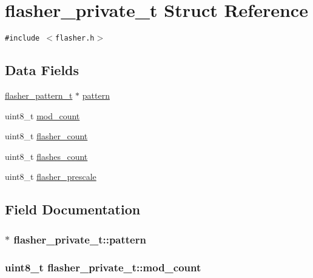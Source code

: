 \hypertarget{structflasher__private__t}{
\section{flasher\_\-private\_\-t Struct Reference}
\label{structflasher__private__t}
}
{\tt \#include $<$flasher.h$>$}

\subsection*{Data Fields}
\begin{CompactItemize}
\item 
\hyperlink{structflasher__pattern__t}{flasher\_\-pattern\_\-t} $\ast$ \hyperlink{structflasher__private__t_ba1d1e2c388c469ffaf6811226e911ab}{pattern}
\item 
uint8\_\-t \hyperlink{structflasher__private__t_6ca9584807ab04f330c5fe49f47a923f}{mod\_\-count}
\item 
uint8\_\-t \hyperlink{structflasher__private__t_d64f71430b08b1983e5ce7b93bfa435f}{flasher\_\-count}
\item 
uint8\_\-t \hyperlink{structflasher__private__t_d420dea019064d7426aa55a1a57693d5}{flashes\_\-count}
\item 
uint8\_\-t \hyperlink{structflasher__private__t_5ad162cba01cb2e4797b6257208d1f43}{flasher\_\-prescale}
\end{CompactItemize}


\subsection{Field Documentation}
\hypertarget{structflasher__private__t_ba1d1e2c388c469ffaf6811226e911ab}{
\subsubsection{$\ast$ {\bf flasher\_\-private\_\-t::pattern}}}
\label{structflasher__private__t_ba1d1e2c388c469ffaf6811226e911ab}


\hypertarget{structflasher__private__t_6ca9584807ab04f330c5fe49f47a923f}{
\subsubsection{\setlength{\rightskip}{0pt plus 5cm}uint8\_\-t {\bf flasher\_\-private\_\-t::mod\_\-count}}}
\label{structflasher__private__t_6ca9584807ab04f330c5fe49f47a923f}


